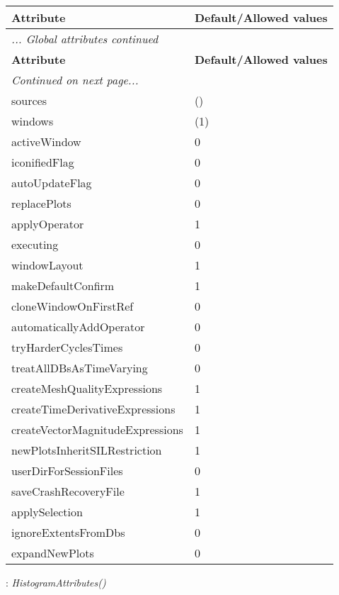 \documentclass[10pt,a4paper]{report}
\begin{document}
\begin{longtable}{ll}
{\bf Attribute} & {\bf Default/Allowed values} \\
\hline \hline
\endfirsthead
\multicolumn{2}{l}{{\it ... Global attributes continued}} \\
{\bf Attribute} & {\bf Default/Allowed values} \\
\hline \hline
\endhead
\hline
\multicolumn{2}{l}{{\it Continued on next page...}} \\
\endfoot
\hline
\endlastfoot

sources  &  () \\
windows  &  (1) \\
activeWindow  &  0 \\
iconifiedFlag  &  0 \\
autoUpdateFlag  &  0 \\
replacePlots  &  0 \\
applyOperator  &  1 \\
executing  &  0 \\
windowLayout  &  1 \\
makeDefaultConfirm  &  1 \\
cloneWindowOnFirstRef  &  0 \\
automaticallyAddOperator  &  0 \\
tryHarderCyclesTimes  &  0 \\
treatAllDBsAsTimeVarying  &  0 \\
createMeshQualityExpressions  &  1 \\
createTimeDerivativeExpressions  &  1 \\
createVectorMagnitudeExpressions  &  1 \\
newPlotsInheritSILRestriction  &  1 \\
userDirForSessionFiles  &  0 \\
saveCrashRecoveryFile  &  1 \\
applySelection  &  1 \\
ignoreExtentsFromDbs  &  0 \\
expandNewPlots  &  0 \\
\end{longtable}

\newpage

{}
: {\it HistogramAttributes() }\\[-3mm]
\end{document}
